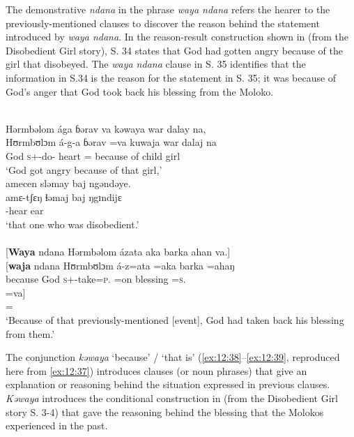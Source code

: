 The demonstrative \textit{ndana} in the phrase \textit{waya ndana} refers the hearer to the previously-mentioned clauses to discover the reason behind the statement introduced by \textit{waya ndana}. In the reason-result construction shown in  (from the Disobedient Girl story), S. 34 states that God had gotten angry because of the girl that disobeyed. The \textit{waya ndana} clause in S. 35 identifies that the information in S.34 is the reason for the statement in S. 35; it was because of God’s anger that God took back his blessing from the Moloko. 

\ea \label{ex:12:37}
\\
Hərmbəlom  ága  ɓərav  va  kəwaya  war  dalay  na,\\  
\gll  Hʊrmbʊlɔm á-g-a ɓərav =va kuwaja war dalaj na\\ 
     God \textsc{s}+{\IFV}-do-{\CL} heart ={\PRF} {because of} child girl {\PSP}\\
\glt ‘God got angry because of that girl,’\\     
     
     \medskip
amecen  sləmay  baj  ngəndəye.  \\     
\gll amɛ-tʃɛŋ ɬəmaj baj ŋgɪndijɛ \\
     {\DEP}-hear ear {\NEG} {\DEM} \\
\glt  ‘that one who was disobedient.’ \\ 

\medskip
{}\\\relax
{}[\textbf{Waya}  ndana  Hərmbəlom  ázata  aka  barka  ahan  va.]\\
\gll {}[\textbf{waja} ndana Hʊrmbʊlɔm á-z=ata =aka barka =ahaŋ\\ 
     because   {\DEM} God \textsc{s}+{\IFV}-take=\textsc{p}.{\IO} =on blessing =\textsc{s}.{\POSS} \\ 
     
\medskip
\gll =va]\\
     ={\PRF}\\
\glt ‘Because of that previously-mentioned [event], God had taken back his blessing from them.’
\z 

The conjunction \textit{kəwaya}  ‘because’ / ‘that is’ (\ref{ex:12:38}--\ref{ex:12:39}, reproduced here from \ref{ex:12:37}) introduces clauses (or noun phrases) that give an explanation or reasoning behind the situation expressed in previous clauses. \textit{Kəwaya} introduces the conditional construction in  (from the Disobedient Girl story S. 3-4) that gave the reasoning behind the blessing that the Molokos experienced in the past. 

